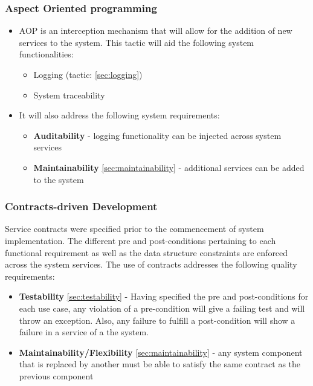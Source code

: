 \subsubsection{Aspect Oriented programming}
\begin{itemize}
		\item AOP is an interception mechanism that will allow for the addition of new services to the system.
This tactic will aid the following system functionalities:
		\begin{itemize}
			\item Logging (tactic: \ref{sec:logging})
		    \item System traceability
		\end{itemize}
\end{itemize}

\begin{itemize}
\item It will also address the following system requirements:
	\begin{itemize}
			\item \textbf{Auditability} - logging functionality can be injected across system services
			\item \textbf{Maintainability} \ref{sec:maintainability} - additional services can be added to the system
		\end{itemize}
\end{itemize}

\subsubsection{Contracts-driven Development} \label{sec:contracts}
Service contracts were specified prior to the commencement of system implementation. The different pre and post-conditions pertaining to each functional requirement as well as the data structure constraints are enforced across the system services. The use of contracts addresses the following quality requirements:
\begin{itemize}
	\item \textbf{Testability} \ref{sec:testability} - Having specified the pre and post-conditions for each use case, any violation of a pre-condition will give a failing test and will throw an exception. Also, any failure to fulfill a post-condition will show a failure in a service of a the system.
	\item \textbf{Maintainability/Flexibility} \ref{sec:maintainability} - any system component that is replaced by another must be able to satisfy the same contract as the previous component
\end{itemize}


